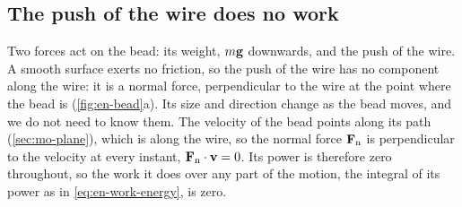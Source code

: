 \subsection*{The push of the wire does no work}

Two forces act on the bead: its weight, $m\bm{\mathrm{g}}$ downwards, and the
push of the wire. A smooth surface exerts no friction, so the push of the
wire has no component along the wire: it is a normal force,
perpendicular to the wire at the point where the bead is
(\cref{fig:en-bead}a). Its size and direction change as the bead moves,
and we do not need to know them. The velocity of the bead points along
its path (\cref{sec:mo-plane}), which is along the wire, so the normal
force $\bm{\mathrm{F}}_{\mathrm{n}}$ is perpendicular to the velocity at every
instant, $\bm{\mathrm{F}}_{\mathrm{n}}\cdot\bm{\mathrm{v}} = 0$. Its power is therefore
zero throughout, so the work it does over any part of the motion, the
integral of its power as in \cref{eq:en-work-energy}, is zero.

